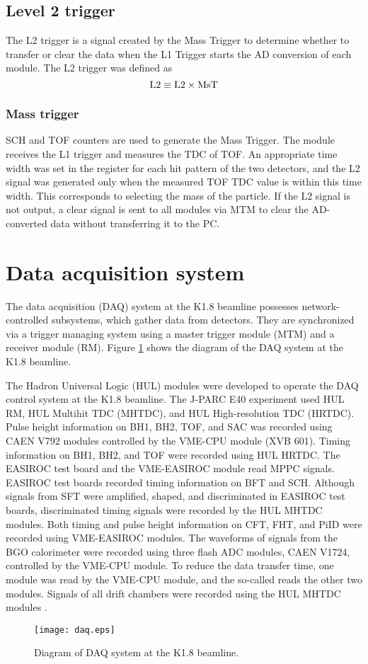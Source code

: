 \subsection{Level 2 trigger}
The L2 trigger is a signal created by the Mass Trigger to determine whether to transfer or clear the data when the L1 Trigger starts the AD conversion of each module. The L2 trigger was defined as 
\begin{equation}
  {\rm L2 \equiv L2 \times MsT}
\end{equation}

%
\subsubsection{Mass trigger}
SCH and TOF counters are used to generate the Mass Trigger. The module receives the L1 trigger and measures the TDC of TOF. An appropriate time width was set in the register for each hit pattern of the two detectors, and the L2 signal was generated only when the measured TOF TDC value is within this time width. This corresponds to selecting the mass of the particle. If the L2 signal is not output, a clear signal is sent to all modules via MTM to clear the AD-converted data without transferring it to the PC. 


\section{Data acquisition system}
The data acquisition (DAQ) system at the K1.8 beamline possesses network-controlled subsystems, which gather data from detectors. They are synchronized via a trigger managing system using a master trigger module (MTM) and a receiver module (RM). Figure \ref{fig-daq} shows the diagram of the DAQ system at the K1.8 beamline.

The Hadron Universal Logic (HUL) modules were developed to operate the DAQ control system at the K1.8 beamline. The J-PARC E40 experiment used HUL RM, HUL Multihit TDC (MHTDC), and HUL High-resolution TDC (HRTDC). Pulse height information on BH1, BH2, TOF, and SAC was recorded using CAEN V792 modules controlled by the VME-CPU module (XVB 601). Timing information on BH1, BH2, and TOF were recorded using HUL HRTDC. The EASIROC test board and the VME-EASIROC module read MPPC signals. EASIROC test boards recorded timing information on BFT and SCH. Although signals from SFT were amplified, shaped, and discriminated in EASIROC test boards, discriminated timing signals were recorded by the HUL MHTDC modules. Both timing and pulse height information on CFT, FHT, and PiID were recorded using VME-EASIROC modules. The waveforms of signals from the BGO calorimeter were recorded using three flash ADC modules, CAEN V1724, controlled by the VME-CPU module. To reduce the data transfer time, one module was read by the VME-CPU module, and the so-called  reads the other two modules. Signals of all drift chambers were recorded using the HUL MHTDC modules \cite{Nana-D}.

\begin{figure}[!h]
 \begin{center}
   \texttt{[image: daq.eps]}
   \caption{Diagram of DAQ system at the K1.8 beamline.}
   \label{fig-daq}
 \end{center}
\end{figure}

%
